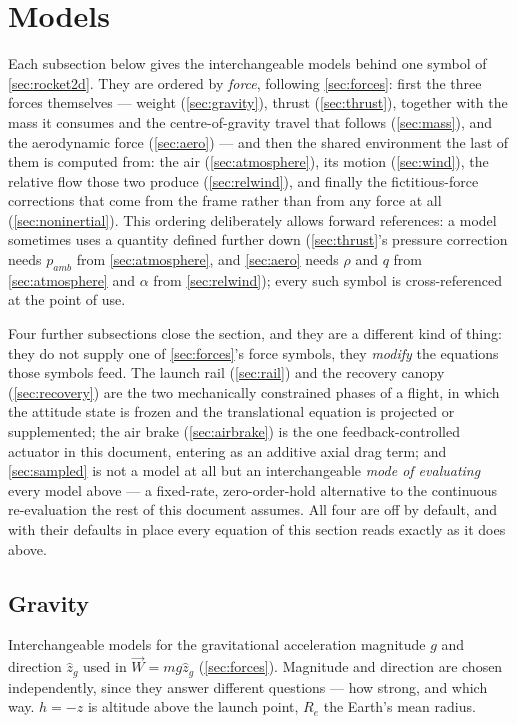 \section{Models}\label{sec:models}
Each subsection below gives the interchangeable models behind one symbol of
\autoref{sec:rocket2d}. They are ordered by \emph{force}, following \autoref{sec:forces}: first
the three forces themselves --- weight (\autoref{sec:gravity}), thrust (\autoref{sec:thrust}),
together with the mass it consumes and the centre-of-gravity travel that follows
(\autoref{sec:mass}), and the aerodynamic force (\autoref{sec:aero}) --- and then the shared
environment the last of them is computed from: the air (\autoref{sec:atmosphere}), its motion
(\autoref{sec:wind}), the relative flow those two produce (\autoref{sec:relwind}), and finally the
fictitious-force corrections that come from the frame rather than from any force at all
(\autoref{sec:noninertial}). This ordering deliberately allows forward references: a model
sometimes uses a quantity defined further down (\autoref{sec:thrust}'s pressure correction needs
$p_{amb}$ from \autoref{sec:atmosphere}, and \autoref{sec:aero} needs $\rho$ and $q$ from
\autoref{sec:atmosphere} and $\alpha$ from \autoref{sec:relwind}); every such symbol is
cross-referenced at the point of use.

Four further subsections close the section, and they are a different kind of thing: they do not
supply one of \autoref{sec:forces}'s force symbols, they \emph{modify} the equations those symbols
feed. The launch rail (\autoref{sec:rail}) and the recovery canopy (\autoref{sec:recovery}) are
the two mechanically constrained phases of a flight, in which the attitude state is frozen and the
translational equation is projected or supplemented; the air brake (\autoref{sec:airbrake}) is the
one feedback-controlled actuator in this document, entering as an additive axial drag term; and
\autoref{sec:sampled} is not a model at all but an interchangeable \emph{mode of evaluating} every
model above --- a fixed-rate, zero-order-hold alternative to the continuous re-evaluation the rest
of this document assumes. All four are off by default, and with their defaults in place every
equation of this section reads exactly as it does above.

\subsection{Gravity}\label{sec:gravity}
Interchangeable models for the gravitational acceleration magnitude $g$ and direction $\hat{z}_g$
used in $\vec{W}=mg\hat{z}_g$ (\autoref{sec:forces}). Magnitude and direction are chosen
independently, since they answer different questions --- how strong, and which way. $h=-z$ is
altitude above the launch point, $R_e$ the Earth's mean radius.

